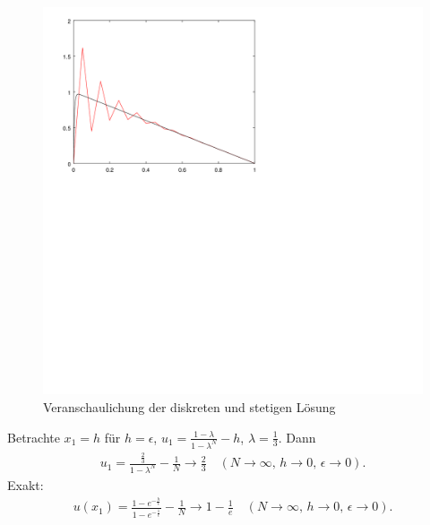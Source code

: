 \begin{enumerate}
\begin{figure}[h!]
  \centering
  \includegraphics[scale=0.6]{1_oscillating.png}
  \caption{Veranschaulichung der diskreten und stetigen Lösung}
  \label{fig:oscillations}
\end{figure}

Betrachte $x_{1} = h$ für $h = \epsilon$, $u_{1} = \frac {1 - \lambda}{1 - \lambda^{N}} - h$, $\lambda = \frac 13$. Dann
\begin{align*}
  u_{1} = \frac {\frac 23}{1 - \lambda^{N}} - \frac 1N \to \frac 23 \quad (N \to \infty, \, h \to 0,\,  \epsilon \to 0). 
\end{align*}
Exakt:
\begin{align*}
  u(x_{1}) = \frac {1 - e^{ - \frac h \epsilon}}{1 - e^{- \frac 1 \epsilon}} - \frac 1 N \to 1 - \frac 1 e \quad (N \to \infty, \, h \to 0,\,  \epsilon \to 0). 
\end{align*}

\end{enumerate}

